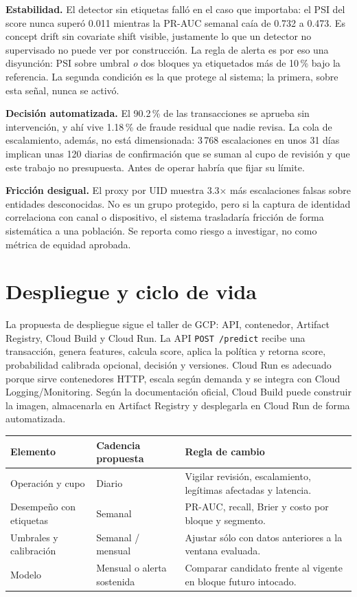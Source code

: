 \documentclass[11pt,letterpaper]{article}
\begin{document}
\textbf{Estabilidad.} El detector sin etiquetas falló en el caso que importaba: el PSI del score nunca superó 0.011 mientras la PR-AUC semanal caía de 0.732 a 0.473. Es concept drift sin covariate shift visible, justamente lo que un detector no supervisado no puede ver por construcción. La regla de alerta es por eso una disyunción: PSI sobre umbral \emph{o} dos bloques ya etiquetados más de 10\,\% bajo la referencia. La segunda condición es la que protege al sistema; la primera, sobre esta señal, nunca se activó.

\textbf{Decisión automatizada.} El 90.2\,\% de las transacciones se aprueba sin intervención, y ahí vive 1.18\,\% de fraude residual que nadie revisa. La cola de escalamiento, además, no está dimensionada: 3\,768 escalaciones en unos 31 días implican unas 120 diarias de confirmación que se suman al cupo de revisión y que este trabajo no presupuesta. Antes de operar habría que fijar su límite.

\textbf{Fricción desigual.} El proxy por UID muestra 3.3$\times$ más escalaciones falsas sobre entidades desconocidas. No es un grupo protegido, pero si la captura de identidad correlaciona con canal o dispositivo, el sistema trasladaría fricción de forma sistemática a una población. Se reporta como riesgo a investigar, no como métrica de equidad aprobada.

\section{Despliegue y ciclo de vida}

La propuesta de despliegue sigue el taller de GCP: API, contenedor, Artifact Registry, Cloud Build y Cloud Run. La API \texttt{POST /predict} recibe una transacción, genera features, calcula score, aplica la política y retorna score, probabilidad calibrada opcional, decisión y versiones. Cloud Run es adecuado porque sirve contenedores HTTP, escala según demanda y se integra con Cloud Logging/Monitoring. Según la documentación oficial, Cloud Build puede construir la imagen, almacenarla en Artifact Registry y desplegarla en Cloud Run de forma automatizada.

\begin{table}[H]\centering\small
\begin{tabularx}{\linewidth}{@{}p{.26\linewidth}p{.22\linewidth}X@{}}\toprule
Elemento & Cadencia propuesta & Regla de cambio\\\midrule
Operación y cupo & Diario & Vigilar revisión, escalamiento, legítimas afectadas y latencia.\\
Desempeño con etiquetas & Semanal & PR-AUC, recall, Brier y costo por bloque y segmento.\\
Umbrales y calibración & Semanal / mensual & Ajustar sólo con datos anteriores a la ventana evaluada.\\
Modelo & Mensual o alerta sostenida & Comparar candidato frente al vigente en bloque futuro intocado.\\\bottomrule
\end{tabularx}
\end{table}
\end{document}
